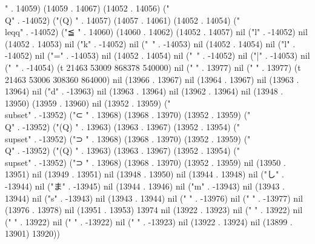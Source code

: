 " . 14059) (14059 . 14067) (14052 . 14056) ("\\Q" . -14052) ("(Q)
" . 14057) (14057 . 14061) (14052 . 14054) ("\\leqq" . -14052) ("≦
" . 14060) (14060 . 14062) (14052 . 14057) nil ("l" . -14052) nil (14052 . 14053) nil ("k" . -14052) nil ("~" . -14053) nil (14052 . 14054) nil ("l" . -14052) nil ("=" . -14053) nil (14052 . 14054) nil ("~" . -14052) nil ("|" . -14053) nil ("~" . -14054) (t 21463 53009 868378 540000) nil (" " . 13977) nil ("
" . 13977) (t 21463 53006 308360 864000) nil (13966 . 13967) nil (13964 . 13967) nil (13963 . 13964) nil ("d" . -13963) nil (13963 . 13964) nil (13962 . 13964) nil (13948 . 13950) (13959 . 13960) nil (13952 . 13959) ("\\subset" . -13952) ("⊂
" . 13968) (13968 . 13970) (13952 . 13959) ("\\Q" . -13952) ("(Q)
" . 13963) (13963 . 13967) (13952 . 13954) ("\\supset" . -13952) ("⊃
" . 13968) (13968 . 13970) (13952 . 13959) ("\\Q" . -13952) ("(Q)
" . 13963) (13963 . 13967) (13952 . 13954) ("\\supset" . -13952) ("⊃
" . 13968) (13968 . 13970) (13952 . 13959) nil (13950 . 13951) nil (13949 . 13951) nil (13948 . 13950) nil (13944 . 13948) nil ("し" . -13944) nil ("ま" . -13945) nil (13944 . 13946) nil ("m" . -13943) nil (13943 . 13944) nil ("s" . -13943) nil (13943 . 13944) nil ("
" . -13976) nil (" " . -13977) nil (13976 . 13978) nil (13951 . 13953) 13974 nil (13922 . 13923) nil (" " . 13922) nil ("
" . 13922) nil ("
" . -13922) nil (" " . -13923) nil (13922 . 13924) nil (13899 . 13901) 13920))
